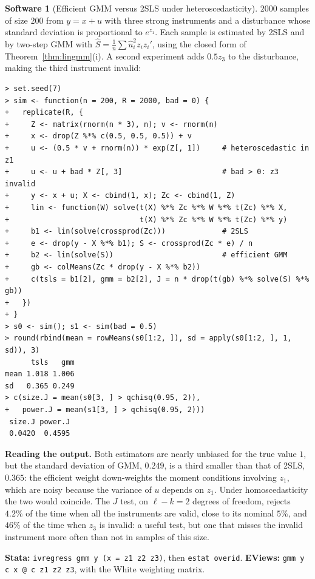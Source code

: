 \documentclass[11pt,a4paper]{article}
\numberwithin{equation}{section}
\theoremstyle{definition}
\newtheorem{software}[thm]{Software}
\begin{document}
\begin{software}[Efficient GMM versus 2SLS under heteroscedasticity]
\label{sw:gmmiv}
$2000$ samples of size $200$ from $y = x + u$ with three strong instruments and a disturbance whose standard deviation is proportional to $e^{z_1}$. Each sample
is estimated by 2SLS and by two-step GMM with $\hat S = \frac1n\sum\hat u_i^2z_iz_i'$, using the closed form of Theorem~\ref{thm:lingmm}(i). A second experiment adds $0.5z_3$ to the
disturbance, making the third instrument invalid:
{\small\begin{verbatim}
> set.seed(7)
> sim <- function(n = 200, R = 2000, bad = 0) {
+   replicate(R, {
+     Z <- matrix(rnorm(n * 3), n); v <- rnorm(n)
+     x <- drop(Z %*% c(0.5, 0.5, 0.5)) + v
+     u <- (0.5 * v + rnorm(n)) * exp(Z[, 1])     # heteroscedastic in z1
+     u <- u + bad * Z[, 3]                       # bad > 0: z3 invalid
+     y <- x + u; X <- cbind(1, x); Zc <- cbind(1, Z)
+     lin <- function(W) solve(t(X) %*% Zc %*% W %*% t(Zc) %*% X,
+                              t(X) %*% Zc %*% W %*% t(Zc) %*% y)
+     b1 <- lin(solve(crossprod(Zc)))             # 2SLS
+     e <- drop(y - X %*% b1); S <- crossprod(Zc * e) / n
+     b2 <- lin(solve(S))                         # efficient GMM
+     gb <- colMeans(Zc * drop(y - X %*% b2))
+     c(tsls = b1[2], gmm = b2[2], J = n * drop(t(gb) %*% solve(S) %*% gb))
+   })
+ }
> s0 <- sim(); s1 <- sim(bad = 0.5)
> round(rbind(mean = rowMeans(s0[1:2, ]), sd = apply(s0[1:2, ], 1, sd)), 3)
      tsls   gmm
mean 1.018 1.006
sd   0.365 0.249
> c(size.J = mean(s0[3, ] > qchisq(0.95, 2)),
+   power.J = mean(s1[3, ] > qchisq(0.95, 2)))
 size.J power.J 
 0.0420  0.4595 
\end{verbatim}}
\textbf{Reading the output.} Both estimators are nearly unbiased for the true value $1$, but the standard deviation of GMM, $0.249$, is a third smaller than that of
2SLS, $0.365$: the efficient weight down-weights the moment conditions involving $z_1$, which are noisy because the variance of $u$ depends on $z_1$. Under homoscedasticity the
two would coincide. The $J$ test, on $\ell - k = 2$ degrees of freedom, rejects $4.2\%$ of the time when all the instruments are valid, close to its nominal $5\%$, and $46\%$ of
the time when $z_3$ is invalid: a useful test, but one that misses the invalid instrument more often than not in samples of this size.

\textbf{Stata:} \texttt{ivregress gmm y (x = z1 z2 z3)}, then \texttt{estat overid}. \textbf{EViews:} \texttt{gmm y c x @ c z1 z2 z3}, with the White weighting matrix.
\end{software}
\end{document}
